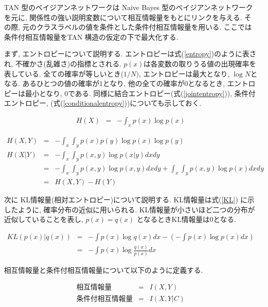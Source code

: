 \documentclass[a4paper]{jarticle}
\begin{document}
TAN 型のベイジアンネットワークは Naive Bayes 型のベイジアンネットワークを元に, 関係性の強い説明変数について相互情報量をもとにリンクを与える. その際, 元のクラスラベルの値を条件とした条件付相互情報量を用いる. ここでは条件付相互情報量をTAN 構造の仮定の下で最大化する.

まず, エントロピーについて説明する. エントロピーは式(\ref{entropy})のように表され, 不確かさ(乱雑さ)の指標とされる. $p(x)$は各変数の取りうる値の出現確率を表している. 全ての確率が等しいとき($1/N)$, エントロピーは最大となり, $\log N$となる. あるひとつの値の確率が$1$となり, 他の全ての確率が$0$となるとき, エントロピーは最小となり, $0$である. 同様に結合エントロピー(式(\ref{jointentropy})), 条件付エントロピー, (式(\ref{conditionalentropy}))についても示しておく.

\begin{eqnarray}
\label{entropy}
H(X) &=& - \int_x p(x) \log p(x) 
\end{eqnarray}

\begin{eqnarray}
\label{jointentropy}
H(X, Y) &=& - \int_x \int_y p(x) p(y) \log p(x) \log p(y) \\
\label{conditionalentropy}
H(X| Y) &=& - \int_x \int_y p(x, y) \log p(x| y) dx dy \nonumber \\
           &=& - \int_x \int_y p(x, y) \log p(x, y) dx dy + \int_x \int_y p(x, y) \log p(x) dx dy \nonumber \\
           &=& H(X, Y) - H(Y)
\end{eqnarray}


次に KL情報量(相対エントロピー)\citep{Meyer}について説明する. KL情報量は式(\ref{KL}) に示したように, 確率分布の近似に用いられる. KL情報量が小さいほど二つの分布が近似していることを表し, $p(x) = q(x)$ となるときKL情報量は$0$となる.

\begin{eqnarray}
\label{KL}
KL(p(x) | q(x)) &=& - \int p(x) \log q(x) dx - \left(- \int p(x) \log p(x) dx \right) \nonumber \\ 
                    &=& - \int p(x) \log \frac{q(x)}{p(x)} dx
\end{eqnarray}

相互情報量と条件付相互情報量について以下のように定義する.

\begin{eqnarray*}
\mbox{相互情報量} &=& I(X, Y) \\
\mbox{条件付相互情報量} &=& I(X, Y | C)
\end{eqnarray*}
\end{document}
